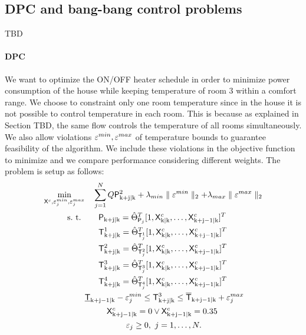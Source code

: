 \subsection{DPC and bang-bang control problems} TBD

\paragraph{DPC}
We want to optimize the ON/OFF heater schedule in order to minimize power consumption of the house while keeping temperature of room $3$ within a comfort range. We choose to constraint only one room temperature since in the house it is not possible to control temperature in each room. This is because as explained in Section TBD, the same flow controls the temperature of all rooms simultaneously. We also allow violations $\varepsilon^{min},\varepsilon^{max}$  of temperature bounds to guarantee feasibility of the algorithm. We include these violations in the objective function to minimize and we compare performance considering different weights. The problem is setup as follows:
\begin{align}
	\begin{aligned}
		\min_{\tX^c,\eps_j^{min},\eps_j^{max}} & \ \ \ \sum_{j=1}^{N} Q{\tP}_{\mathrm{k+j|k}}^2 +  \lambda_{min}\parallel\eps^{min}\parallel_2 + \lambda_{max}\parallel\eps^{max}\parallel_2 \\
		\text{s.~t. }& \ \ \ \ \ {\tP}_{\mathrm{k+j|k}} =  \hat{\Theta}^{T}_{\tP_j} [ 1,\tX^c_{\mathrm{k|k}},\dots,\tX^c_{\mathrm{k+j-1|k}} ]^T \\
					 & \ \ \ \ \ \tT^1_{\mathrm{k+j|k}} =  \hat{\Theta}^{T}_{\tT^1_j} [ 1,\tX^c_{\mathrm{k|k}},\dots,\tX^c_{\mathrm{k+j-1|k}} ]^T \\
					 & \ \ \ \ \ \tT^2_{\mathrm{k+j|k}} =  \hat{\Theta}^{T}_{\tT^2_j} [ 1,\tX^c_{\mathrm{k|k}},\dots,\tX^c_{\mathrm{k+j-1|k}} ]^T \\
			 	 	 & \ \ \ \ \ \tT^3_{\mathrm{k+j|k}} =  \hat{\Theta}^{T}_{\tT^3_j} [ 1,\tX^c_{\mathrm{k|k}},\dots,\tX^c_{\mathrm{k+j-1|k}} ]^T \\
				 	 & \ \ \ \ \ \tT^4_{\mathrm{k+j|k}} =  \hat{\Theta}^{T}_{\tT^4_j} [ 1,\tX^c_{\mathrm{k|k}},\dots,\tX^c_{\mathrm{k+j-1|k}} ]^T \\					
					 & \underline{\tT}_{\mathrm{k+j-1|k}}-\eps^{min}_j \leq \tT^3_{\mathrm{k+j|k}} \leq \overline{\tT}_{\mathrm{k+j-1|k}} + \eps^{max}_j\\
					 & \ \ \ \ \ \ \ \ \tX^c_{\mathrm{k+j-1|k}} = 0 \lor \tX^c_{\mathrm{k+j-1|k}} = 0.35\\ 
					 & \ \ \ \ \ \ \ \ \ \ \ \ \ \ \ \eps_j \geq 0, \ j = 1,\dots,N.
	\end{aligned}
	\label{E:DPCrealcase}
\end{align}
